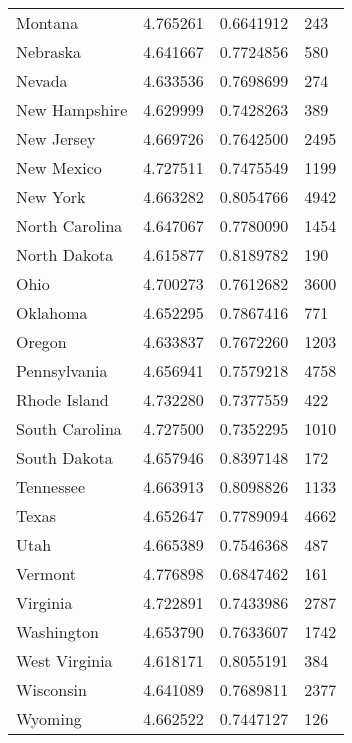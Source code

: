 \documentclass[
]{article}
\begin{document}
\begin{landscape}
\begin{longtable}[t]{llll}
\addlinespace
Montana & 4.765261 & 0.6641912 & 243\\
Nebraska & 4.641667 & 0.7724856 & 580\\
Nevada & 4.633536 & 0.7698699 & 274\\
New Hampshire & 4.629999 & 0.7428263 & 389\\
New Jersey & 4.669726 & 0.7642500 & 2495\\
\addlinespace
New Mexico & 4.727511 & 0.7475549 & 1199\\
New York & 4.663282 & 0.8054766 & 4942\\
North Carolina & 4.647067 & 0.7780090 & 1454\\
North Dakota & 4.615877 & 0.8189782 & 190\\
Ohio & 4.700273 & 0.7612682 & 3600\\
\addlinespace
Oklahoma & 4.652295 & 0.7867416 & 771\\
Oregon & 4.633837 & 0.7672260 & 1203\\
Pennsylvania & 4.656941 & 0.7579218 & 4758\\
Rhode Island & 4.732280 & 0.7377559 & 422\\
South Carolina & 4.727500 & 0.7352295 & 1010\\
\addlinespace
South Dakota & 4.657946 & 0.8397148 & 172\\
Tennessee & 4.663913 & 0.8098826 & 1133\\
Texas & 4.652647 & 0.7789094 & 4662\\
Utah & 4.665389 & 0.7546368 & 487\\
Vermont & 4.776898 & 0.6847462 & 161\\
\addlinespace
Virginia & 4.722891 & 0.7433986 & 2787\\
Washington & 4.653790 & 0.7633607 & 1742\\
West Virginia & 4.618171 & 0.8055191 & 384\\
Wisconsin & 4.641089 & 0.7689811 & 2377\\
Wyoming & 4.662522 & 0.7447127 & 126\\*
\end{longtable}
\end{landscape}
\endgroup{}

\begingroup\fontsize{12}{14}\selectfont
\end{document}
